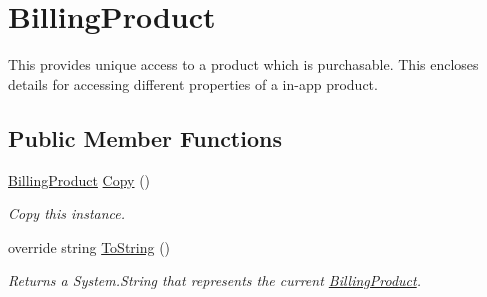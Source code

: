 \hypertarget{class_voxel_busters_1_1_native_plugins_1_1_billing_product}{}\section{Billing\+Product}
\label{class_voxel_busters_1_1_native_plugins_1_1_billing_product}


This provides unique access to a product which is purchasable. This encloses details for accessing different properties of a in-\/app product.  


\subsection*{Public Member Functions}
\begin{DoxyCompactItemize}
\item 
\hyperlink{class_voxel_busters_1_1_native_plugins_1_1_billing_product}{Billing\+Product} \hyperlink{class_voxel_busters_1_1_native_plugins_1_1_billing_product_a7e85d14fdf6a4bf118fbf98d6720897b}{Copy} ()
\begin{DoxyCompactList}\small\item\em Copy this instance. \end{DoxyCompactList}\item 
override string \hyperlink{class_voxel_busters_1_1_native_plugins_1_1_billing_product_aa73e7c4dd1df5fd5fbf81c7764ee1533}{To\+String} ()
\begin{DoxyCompactList}\small\item\em Returns a System.\+String that represents the current \hyperlink{class_voxel_busters_1_1_native_plugins_1_1_billing_product}{Billing\+Product}. \end{DoxyCompactList}\end{DoxyCompactItemize}
